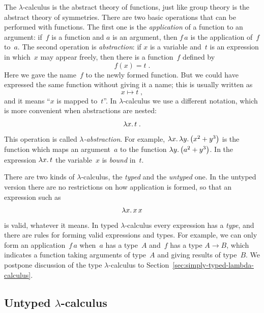 The $\lambda$-calculus is the abstract theory of functions, just like
group theory is the abstract theory of symmetries. There are two basic
operations that can be performed with functions. The first one is the
\emph{application} of a function to an argument: if~$f$ is a function
and $a$ is an argument, then $f\, a$ is the application of~$f$ to~$a$.
The second operation is \emph{abstraction}: if $x$ is a variable
and~$t$ is an expression in which~$x$ may appear freely, then there is
a function~$f$ defined by
%
\begin{equation*}
  f(x) = t \;.
\end{equation*}
%
Here we gave the name~$f$ to the newly formed function. But we could
have expressed the same function without giving it a name;
this is usually written as
%
\begin{equation*}
  x \mapsto t \;,
\end{equation*}
%
and it means ``$x$ is mapped to~$t$''. In $\lambda$-calculus we use a
different notation, which is more convenient when abstractions are
nested:
%
\begin{equation*}
  \lambda x .\,t \;.
\end{equation*}
%
This operation is called \emph{$\lambda$-abstraction}. For example,
$\lambda x .\,\lambda y .\left(x^2 + y^3\right)$ is the function which maps an
argument~$a$ to the function $\lambda y .\left(a^2 + y^3\right)$. In the expression
$\lambda x .\,t$ the variable~$x$ is \emph{bound} in~$t$.

There are two kinds of $\lambda$-calculus, the \emph{typed} and the
\emph{untyped} one. In the untyped version there are no restrictions
on how application is formed, so that an expression such as
%
\begin{equation*}
  \lambda x .\,x\, x
\end{equation*}
%
is valid, whatever it means. In typed $\lambda$-calculus every
expression has a \emph{type}, and there are rules for forming valid
expressions and types. For example, we can only form an
application~$f\, a$ when~$a$ has a type~$A$ and~$f$ has a type $A \to
B$, which indicates a function taking arguments of type~$A$ and giving
results of type~$B$. We postpone discussion of the type
$\lambda$-calculus to Section~\ref{sec:simply-typed-lambda-calculus}.

\subsection{Untyped $\lambda$-calculus}
\label{sec:untyped-lambda-calculus}

